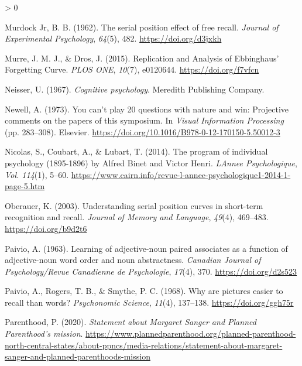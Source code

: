 \documentclass[
  oneside,
  12pt]{crumpbook}
\newlength{\cslhangindent}
\newenvironment{CSLReferences}[2] %
 {%
  \setlength{\parindent}{0pt}
  \ifodd #1 \everypar{\setlength{\hangindent}{\cslhangindent}}\ignorespaces\fi
  \ifnum #2 > 0
  \setlength{\parskip}{#2\baselineskip}
  \fi
 }%
 {}
\begin{document}
\begin{CSLReferences}{1}{0}
\leavevmode\hypertarget{ref-murdockjrSerialPositionEffect1962}{}%
Murdock Jr, B. B. (1962). The serial position effect of free recall. \emph{Journal of Experimental Psychology}, \emph{64}(5), 482. \url{https://doi.org/d3jxkh}

\leavevmode\hypertarget{ref-murreReplicationAnalysisEbbinghaus2015}{}%
Murre, J. M. J., \& Dros, J. (2015). Replication and {Analysis} of {Ebbinghaus}' {Forgetting Curve}. \emph{PLOS ONE}, \emph{10}(7), e0120644. \url{https://doi.org/f7vfcn}

\leavevmode\hypertarget{ref-neisserCognitivePsychology1967}{}%
Neisser, U. (1967). \emph{Cognitive psychology}. {Meredith Publishing Company}.

\leavevmode\hypertarget{ref-newellYouCanPlay1973}{}%
Newell, A. (1973). You can't play 20 questions with nature and win: {Projective} comments on the papers of this symposium. In \emph{Visual {Information Processing}} (pp. 283--308). {Elsevier}. \url{https://doi.org/10.1016/B978-0-12-170150-5.50012-3}

\leavevmode\hypertarget{ref-nicolasProgramIndividualPsychology2014}{}%
Nicolas, S., Coubart, A., \& Lubart, T. (2014). The program of individual psychology (1895-1896) by {Alfred Binet} and {Victor Henri}. \emph{LAnnee Psychologique}, \emph{Vol. 114}(1), 5--60. \url{https://www.cairn.info/revue-l-annee-psychologique1-2014-1-page-5.htm}

\leavevmode\hypertarget{ref-oberauerUnderstandingSerialPosition2003}{}%
Oberauer, K. (2003). Understanding serial position curves in short-term recognition and recall. \emph{Journal of Memory and Language}, \emph{49}(4), 469--483. \url{https://doi.org/b9d2t6}

\leavevmode\hypertarget{ref-paivioLearningAdjectivenounPaired1963}{}%
Paivio, A. (1963). Learning of adjective-noun paired associates as a function of adjective-noun word order and noun abstractness. \emph{Canadian Journal of Psychology/Revue Canadienne de Psychologie}, \emph{17}(4), 370. \url{https://doi.org/d2s523}

\leavevmode\hypertarget{ref-paivioWhyArePictures1968}{}%
Paivio, A., Rogers, T. B., \& Smythe, P. C. (1968). Why are pictures easier to recall than words? \emph{Psychonomic Science}, \emph{11}(4), 137--138. \url{https://doi.org/ggh75r}

\leavevmode\hypertarget{ref-plannedparenthoodStatementMargaretSanger2020}{}%
Parenthood, P. (2020). \emph{Statement about {Margaret Sanger} and {Planned Parenthood}'s mission}. \url{https://www.plannedparenthood.org/planned-parenthood-north-central-states/about-ppncs/media-relations/statement-about-margaret-sanger-and-planned-parenthoods-mission}


\end{CSLReferences}
\end{document}
